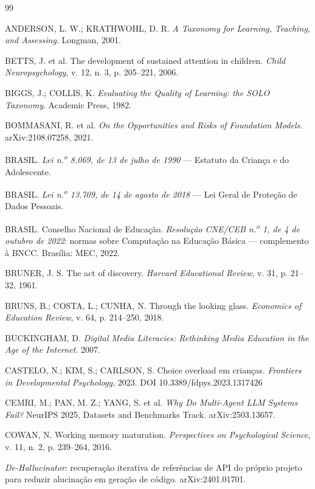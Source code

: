 \documentclass[11pt,a4paper]{article}
\begin{document}
\begin{thebibliography}{99}\footnotesize
\setlength{\itemsep}{2pt}

ANDERSON, L. W.; KRATHWOHL, D. R. \textit{A Taxonomy for Learning, Teaching, and Assessing}. Longman, 2001.

BETTS, J. et al. The development of sustained attention in children. \textit{Child Neuropsychology}, v. 12, n. 3, p. 205--221, 2006.

BIGGS, J.; COLLIS, K. \textit{Evaluating the Quality of Learning: the SOLO Taxonomy}. Academic Press, 1982.

BOMMASANI, R. et al. \textit{On the Opportunities and Risks of Foundation Models}. arXiv:2108.07258, 2021.

BRASIL. \textit{Lei n.\textsuperscript{o} 8.069, de 13 de julho de 1990} --- Estatuto da Criança e do Adolescente.

BRASIL. \textit{Lei n.\textsuperscript{o} 13.709, de 14 de agosto de 2018} --- Lei Geral de Proteção de Dados Pessoais.

BRASIL. Conselho Nacional de Educação. \textit{Resolução CNE/CEB n.\textsuperscript{o} 1, de 4 de outubro de 2022}: normas sobre Computação na Educação Básica --- complemento à BNCC. Brasília: MEC, 2022.

BRUNER, J. S. The act of discovery. \textit{Harvard Educational Review}, v. 31, p. 21--32, 1961.

BRUNS, B.; COSTA, L.; CUNHA, N. Through the looking glass. \textit{Economics of Education Review}, v. 64, p. 214--250, 2018.

BUCKINGHAM, D. \textit{Digital Media Literacies: Rethinking Media Education in the Age of the Internet}. 2007.

CASTELO, N.; KIM, S.; CARLSON, S. Choice overload em crianças. \textit{Frontiers in Developmental Psychology}, 2023. DOI 10.3389/fdpys.2023.1317426

CEMRI, M.; PAN, M. Z.; YANG, S. et al. \textit{Why Do Multi-Agent LLM Systems Fail?} NeurIPS 2025, Datasets and Benchmarks Track. arXiv:2503.13657.

COWAN, N. Working memory maturation. \textit{Perspectives on Psychological Science}, v. 11, n. 2, p. 239--264, 2016.

\textit{De-Hallucinator}: recuperação iterativa de referências de API do próprio projeto para reduzir alucinação em geração de código. arXiv:2401.01701.


\end{thebibliography}
\end{document}
